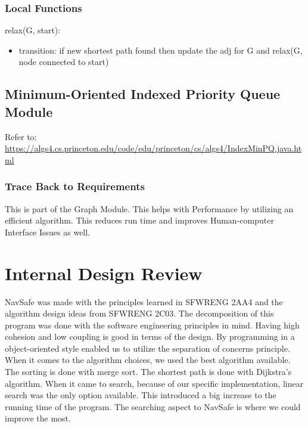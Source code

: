 \documentclass[12pt]{article}
\begin{document}
\subsubsection*{Local Functions}

relax(G, start):
\begin{itemize}
    \item transition: if new shortest path found then update the adj for G and relax(G, node connected to start)
\end{itemize}

\newpage
\subsection{Minimum-Oriented Indexed Priority Queue Module}
Refer to: \url{https://algs4.cs.princeton.edu/code/edu/princeton/cs/algs4/IndexMinPQ.java.html}

\subsubsection*{Trace Back to Requirements}
This is part of the Graph Module. This helps with Performance by utilizing an efficient algorithm. This reduces run time and improves Human-computer Interface Issues as well.

\newpage
\section{Internal Design Review}
NavSafe was made with the principles learned in SFWRENG 2AA4 and the algorithm design ideas from SFWRENG 2C03. The decomposition of this program was done with the software engineering principles in mind. Having high cohesion and low coupling is good in terms of the design. By programming in a object-oriented style enabled us to utilize the separation of concerns principle. When it comes to the algorithm choices, we used the best algorithm available. The sorting is done with merge sort. The shortest path is done with Dijkstra's algorithm. When it came to search, because of our specific implementation, linear search was the only option available. This introduced a big increase to the running time of the program. The searching aspect to NavSafe is where we could improve the most.
\end{document}
